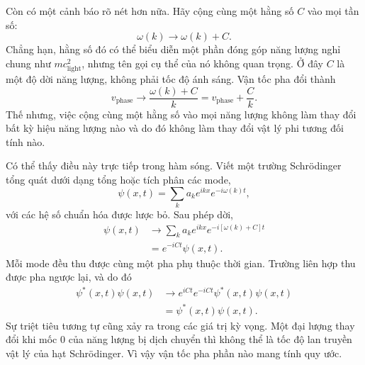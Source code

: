 Còn có một cảnh báo rõ nét hơn nữa. Hãy cộng cùng một hằng số \(C\) vào mọi tần số:
\begin{equation}
\omega(k)\longrightarrow \omega(k)+C.
\end{equation}
Chẳng hạn, hằng số đó có thể biểu diễn một phần đóng góp năng lượng nghỉ chung như \(mc_{\mathrm{light}}^2\), nhưng tên gọi cụ thể của nó không quan trọng. Ở đây \(C\) là một độ dời năng lượng, không phải tốc độ ánh sáng. Vận tốc pha đổi thành
\begin{equation}
v_{\mathrm{phase}}\longrightarrow
\frac{\omega(k)+C}{k}
=v_{\mathrm{phase}}+\frac{C}{k}.
\end{equation}
Thế nhưng, việc cộng cùng một hằng số vào mọi năng lượng không làm thay đổi bất kỳ hiệu năng lượng nào và do đó không làm thay đổi vật lý phi tương đối tính nào.

Có thể thấy điều này trực tiếp trong hàm sóng. Viết một trường Schr\"odinger tổng quát dưới dạng tổng hoặc tích phân các mode,
\begin{equation}
\psi(x,t)=\sum_k a_k e^{ikx}e^{-i\omega(k)t},
\end{equation}
với các hệ số chuẩn hóa được lược bỏ. Sau phép dời,
\begin{align}
\psi(x,t)
&\longrightarrow
\sum_k a_k e^{ikx}e^{-i[\omega(k)+C]t}
\\
&=e^{-iCt}\psi(x,t).
\end{align}
Mỗi mode đều thu được cùng một pha phụ thuộc thời gian. Trường liên hợp thu được pha ngược lại, và do đó
\begin{equation}
\begin{aligned}
\psi^*(x,t)\psi(x,t)
&\longrightarrow
e^{iCt}e^{-iCt}\psi^*(x,t)\psi(x,t)
\\
&=\psi^*(x,t)\psi(x,t).
\end{aligned}
\end{equation}
Sự triệt tiêu tương tự cũng xảy ra trong các giá trị kỳ vọng. Một đại lượng thay đổi khi mốc 0 của năng lượng bị dịch chuyển thì không thể là tốc độ lan truyền vật lý của hạt Schr\"odinger. Vì vậy vận tốc pha phần nào mang tính quy ước.

